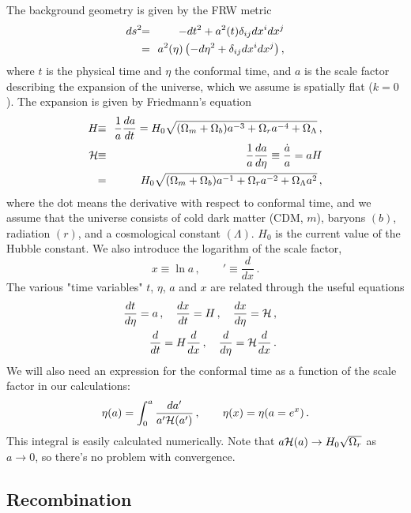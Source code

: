 \documentclass[twocolumn,nofootinbib,amsmath,amssymb]{revtex4}
\newcommand{\be}{\begin{equation}}
\newcommand{\ee}{\end{equation}}
\newcommand{\ba}{\begin{eqnarray}}
\newcommand{\ea}{\end{eqnarray}}
\newcommand{\hs}{\hspace{-1.12mm}}
\newcommand{\eq}{\hs & = & \hs}
\newcommand{\eqequiv}{\hs & \equiv & \hs}
\begin{document}
The background geometry is given by the FRW metric
\ba
  ds^2 \eq -dt^2 + a^2(t) \delta_{ij} dx^i dx^j \nonumber \\
  \eq a^2(\eta) \left( -d\eta^2 + \delta_{ij} dx^i dx^j \right) ,
\ea
where $t$ is the physical time and $\eta$ the conformal time, and $a$ is the
scale factor describing the expansion of the universe, which we assume is
spatially flat ($k=0$). The expansion is given by Friedmann's equation
\ba
  H \eqequiv \frac{1}{a} \frac{da}{dt} =
    H_0 \sqrt{
      (\Omega_m + \Omega_b) a^{-3} + \Omega_r a^{-4} + \Omega_\Lambda
    } \, , \nonumber \\
  {\cal H} \eqequiv \frac{1}{a} \frac{da}{d\eta} \equiv
    \frac{\dot{a}}{a} = a H \nonumber \\
  \eq H_0 \sqrt{
      (\Omega_m + \Omega_b) a^{-1} + \Omega_r a^{-2} + \Omega_\Lambda a^2
    } \, ,
  \label{eq:Hubble}
\ea
where the dot means the derivative with respect to conformal time, and we
assume that the universe consists of cold dark matter (CDM, $m$), baryons
$(b)$, radiation $(r)$, and a cosmological constant $(\Lambda)$. $H_0$ is the
current value of the Hubble constant. We also introduce the logarithm of the
scale factor,
\be
  x \equiv \ln a \, , \qquad ' \equiv \frac{d}{dx} \, .
\ee
The various "time variables" $t$, $\eta$, $a$ and $x$ are related through the
useful equations
\ba
  \frac{dt}{d\eta} = a \, , \quad \frac{dx}{dt} = H \, , \quad
  \frac{dx}{d\eta} = {\cal H} \, , && \nonumber \\
  \frac{d}{dt} = H \frac{d}{dx} \, , \quad
  \frac{d}{d\eta} = {\cal H} \frac{d}{dx} \, . &&
\ea
We will also need an expression for the conformal time as a function of the
scale factor in our calculations:
\be
  \eta(a) = \int_0^a \frac{da'}{a' {\cal H}(a')} \, , \qquad
  \eta(x) = \eta(a = e^x) \, .
  \label{eq:eta_a}
\ee
This integral is easily calculated numerically. Note that $a {\cal H}(a) \to
H_0 \sqrt{\Omega_r}$ as $a \to 0$, so there's no problem with convergence.


\subsection{Recombination}
\label{cha:recombination}
\end{document}
